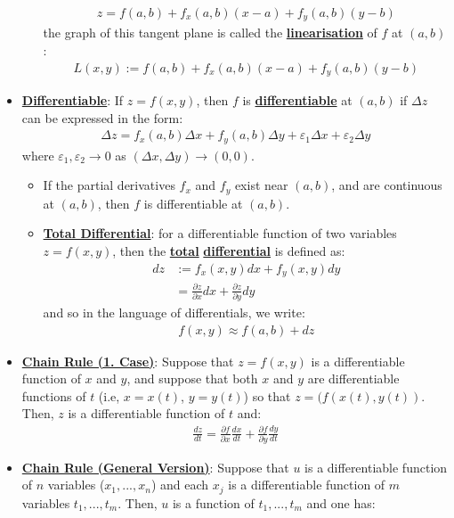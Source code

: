 \documentclass[reqno,11pt]{amsart}
\theoremstyle{definition}
\theoremstyle{remark}
\newcommand{\dfn}[1]{\underline{\textbf{#1}}}
\begin{document}
\begin{itemize}[noitemsep]
\begin{itemize}[noitemsep]
\begin{align}
			z = f(a,b) + f_x(a,b) (x-a) + f_y(a,b) (y-b) 	
		\end{align}
		the graph of this tangent plane is called the \dfn{linearisation} of $f$ at $(a,b)$: 
		\begin{align}
			L(x,y) := f(a,b) + f_x(a,b) (x-a) + f_y(a,b) (y-b)	
		\end{align}
	\end{itemize}
	\item \dfn{Differentiable}: If $z = f(x,y)$, then $f$ is \dfn{differentiable} at $(a,b)$ if $\Delta z$ can be expressed in the form: 
	\begin{align}
		\Delta z = f_x (a,b) \Delta x + f_y (a,b) \Delta y + \varepsilon_1 \Delta x + \varepsilon_2 \Delta y	
	\end{align}
	where $\varepsilon_1, \varepsilon_2 \rightarrow 0$ as $(\Delta x, \Delta y) \rightarrow  (0,0)$.
	\begin{itemize}[noitemsep]
		\item If the partial derivatives $f_x$ and $f_y$ exist near $(a,b)$, and are continuous at $(a,b)$, then $f$ is differentiable at $(a,b)$.
		\item \dfn{Total Differential}: for a differentiable function of two variables $z = f(x,y)$, then the \dfn{total} \dfn{differential} is defined as: 
		\begin{align*}
			dz & := f_x (x,y) dx + f_y (x,y) dy 	\\
			   & = \frac{\partial z}{\partial x} dx + \frac{\partial z}{\partial y} dy
		\end{align*} 
		and so in the language of differentials, we write: 
		\begin{align*}
			f(x,y) \approx f(a,b) + dz
		\end{align*}
	\end{itemize}
	\item \dfn{Chain Rule (1. Case)}: Suppose that $z= f(x,y)$ is a differentiable function of $x$ and $y$, and suppose that both $x$ and $y$ are differentiable functions of $t$ (i.e, $x=x(t)$, $y=y(t)$) so that $z = (f(x(t), y(t))$. Then, $z$ is a differentiable function of $t$ and: 
	\begin{align}
		\frac{dz}{dt} = \frac{\partial f}{\partial x} \frac{dx}{dt} + \frac{\partial f}{\partial y}\frac{dy}{dt}	
	\end{align}
	\item \dfn{Chain Rule (General Version)}: Suppose that $u$ is a differentiable function of $n$ variables ($x_1, ..., x_n$) and each $x_j$ is a differentiable function of $m$ variables $t_1, ..., t_m$. Then, $u$ is a function of $t_1, ..., t_m$ and one has: 

\end{itemize}
\end{document}
